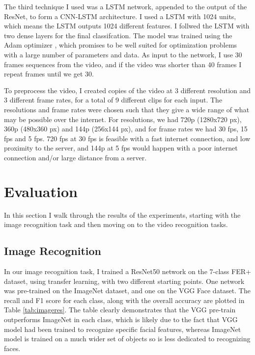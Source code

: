 \documentclass[sigconf]{acmart}
\begin{document}
{The third technique I used was a LSTM network, appended to the output of the
ResNet, to form a CNN-LSTM architecture. I used a LSTM with 1024 units, which
means the LSTM outputs 1024 different features. I follwed the LSTM with two
dense layers for the final classifcation. The model was trained using the Adam
optimizer \cite{kingma2014adam}, which promises to be well suited for
optimization problems with a large number of parameters and data. As input to
the network, I use 30 frames sequences from the video, and if the video was
shorter than 40 frames I repeat frames until we get 30. 

To preprocess the video, I created copies of the video at 3 different
resolution and 3 different frame rates, for a total of 9 different clips for
each input. The resolutions and frame rates were chosen such that they give a
wide range of what may be possible over the internet. For resolutions, we had
720p (1280x720 px), 360p (480x360 px) and 144p (256x144 px), and for
frame rates we had 30 fps, 15 fps and 5 fps. 720 fps at 30 fps is feasible
with a fast internet connection, and low proximity to the server, and 144p at
5 fps would happen with a poor internet connection and/or large distance from
a server. 

\section{Evaluation}

In this section I walk through the results of the experiments, starting with
the image recognition task and then moving on to the video recognition tasks.

\subsection{Image Recognition}

In our image recognition task, I trained a ResNet50 network on the 7-class FER+
dataset, using transfer learning, with two different starting points. One
network was pre-trained on the ImageNet dataset, and one on the VGG Face
dataset. The recall and F1 score for each class, along with the overall
accuracy are plotted in Table \ref{tab:imageres}. The table clearly
demonstrates that the VGG pre-train outperforms ImageNet in each class, which
is likely due to the fact that VGG model had been trained to recognize specific facial
features, whereas ImageNet model is trained on a much wider set of objects so is
less dedicated to recognizing faces.

}
\end{document}
